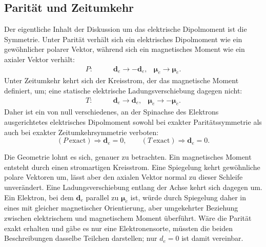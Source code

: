 \begin{classroomqa}
\end{classroomqa}

\subsection{Parität und Zeitumkehr}

Der eigentliche Inhalt der Diskussion um das elektrische Dipolmoment ist die Symmetrie. Unter Parität verhält sich ein elektrisches Dipolmoment wie ein gewöhnlicher polarer Vektor, während sich ein magnetisches Moment wie ein axialer Vektor verhält:
\begin{align}
P:\qquad &\mathbf d_e \to -\mathbf d_e,
&\boldsymbol{\mu}_e \to \boldsymbol{\mu}_e .
\end{align}
Unter Zeitumkehr kehrt sich der Kreisstrom, der das magnetische Moment definiert, um; eine statische elektrische Ladungsverschiebung dagegen nicht:
\begin{align}
T:\qquad &\mathbf d_e \to \mathbf d_e,
&\boldsymbol{\mu}_e \to -\boldsymbol{\mu}_e .
\end{align}
Daher ist ein von null verschiedenes, an der Spinachse des Elektrons ausgerichtetes elektrisches Dipolmoment sowohl bei exakter Paritätssymmetrie als auch bei exakter Zeitumkehrsymmetrie verboten:
\begin{equation}
(P\ \text{exact}) \Rightarrow \mathbf d_e=0,
\qquad
(T\ \text{exact}) \Rightarrow \mathbf d_e=0.
\end{equation}

Die Geometrie lohnt es sich, genauer zu betrachten. Ein magnetisches Moment entsteht durch einen stromartigen Kreisstrom. Eine Spiegelung kehrt gewöhnliche polare Vektoren um, lässt aber den axialen Vektor normal zu dieser Schleife unverändert. Eine Ladungsverschiebung entlang der Achse kehrt sich dagegen um. Ein Elektron, bei dem \(\mathbf d_e\) parallel zu \(\boldsymbol\mu_e\) ist, würde durch Spiegelung daher in eines mit gleicher magnetischer Orientierung, aber umgekehrter Beziehung zwischen elektrischem und magnetischem Moment überführt. Wäre die Parität exakt erhalten und gäbe es nur eine Elektronensorte, müssten die beiden Beschreibungen dasselbe Teilchen darstellen; nur \(d_e=0\) ist damit vereinbar.

